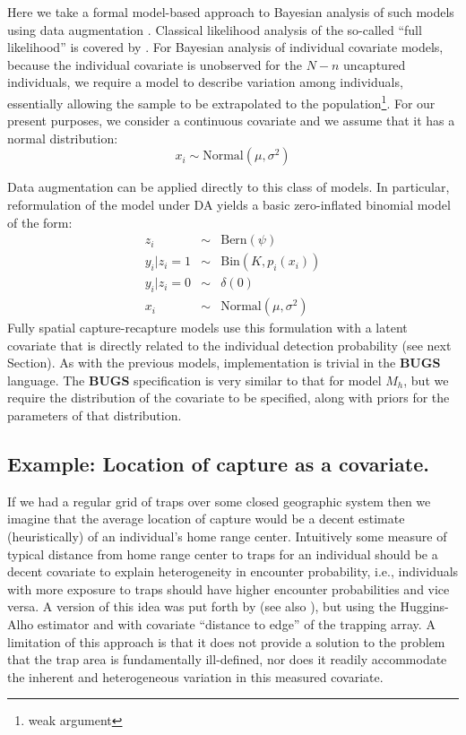 Here we take a formal model-based approach to Bayesian analysis of
such models using data augmentation \citep{royle:2009}. Classical
likelihood analysis of the so-called ``full likelihood'' is covered 
 by \citet{borchers_etal:2002}.  For Bayesian analysis of
individual covariate models, because the individual covariate is
unobserved for the $N-n$ uncaptured individuals, we require a model to
describe variation among individuals, essentially allowing the sample
to be extrapolated to the population\footnote{weak argument}.  For our present purposes, we
consider a continuous covariate and we assume that it has a normal
distribution:
\[
x_{i} \sim \mbox{Normal}(\mu,\sigma^{2})
\]

Data augmentation can be applied directly to this class of models. In
particular, reformulation of the model under DA yields a basic
zero-inflated binomial model of the form:
\begin{eqnarray*}
z_{i} &\sim& \mbox{Bern}(\psi) \\
y_{i}|{z_{i}\! =\! 1} &\sim& \mbox{Bin}(K,p_{i}(x_{i})) \\
y_{i} |{ z_{i}\! =\! 0} &\sim& \delta(0)  \\
x_{i} & \sim & \mbox{Normal}(\mu,\sigma^{2})
\end{eqnarray*}
Fully spatial capture-recapture models use this
formulation with a latent covariate that is directly related to the
individual detection probability (see next Section). As with the
previous models, implementation is trivial in the {\bf BUGS} language. The
{\bf BUGS} specification is very similar to that for model $M_h$, but we
require the distribution of the covariate to be specified, along with
priors for the parameters of that distribution.


\subsection{Example: Location of capture as a covariate.}

If we had a regular grid of traps over some closed geographic system
then we imagine that the average location of capture would be a decent
estimate (heuristically) of an individual's home range center.
Intuitively some measure of typical distance from home range center to
traps for an individual should be a decent covariate to explain
heterogeneity in encounter probability, i.e., individuals with more
exposure to traps should have higher encounter probabilities and vice
versa.  A version of this idea was put forth by
\citet{boulanger_mclellan:2001} (see also \citet{ivan:2012}), but
using the Huggins-Alho estimator and with covariate ``distance to
edge'' of the trapping array. A limitation of this  approach is
that it does not provide a solution to the problem that the trap area
is fundamentally ill-defined, nor does it readily accommodate the
inherent and heterogeneous variation in this measured covariate.

